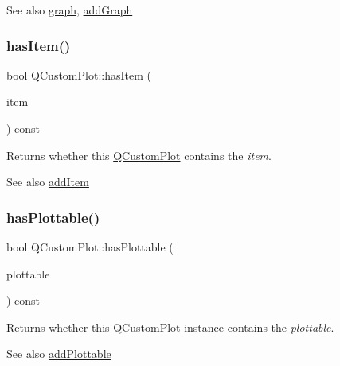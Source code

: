 \begin{DoxySeeAlso}{See also}
\hyperlink{class_q_custom_plot_a6ecae130f684b25276fb47bd3a5875c6}{graph}, \hyperlink{class_q_custom_plot_a6fb2873d35a8a8089842d81a70a54167}{add\+Graph} 
\end{DoxySeeAlso}
\hypertarget{class_q_custom_plot_af0b57f35646079f93fa6161a65b36109}{}\label{class_q_custom_plot_af0b57f35646079f93fa6161a65b36109} 
\subsubsection{\texorpdfstring{has\+Item()}{hasItem()}}
{\footnotesize\ttfamily bool Q\+Custom\+Plot\+::has\+Item (\begin{DoxyParamCaption}\item[{\hyperlink{class_q_c_p_abstract_item}{Q\+C\+P\+Abstract\+Item} $\ast$}]{item }\end{DoxyParamCaption}) const}

Returns whether this \hyperlink{class_q_custom_plot}{Q\+Custom\+Plot} contains the {\itshape item}.

\begin{DoxySeeAlso}{See also}
\hyperlink{class_q_custom_plot_aa500620379262321685cb7a7674cbd2a}{add\+Item} 
\end{DoxySeeAlso}
\hypertarget{class_q_custom_plot_a72cefbfbb9e699940e37be605bd9c51e}{}\label{class_q_custom_plot_a72cefbfbb9e699940e37be605bd9c51e} 
\subsubsection{\texorpdfstring{has\+Plottable()}{hasPlottable()}}
{\footnotesize\ttfamily bool Q\+Custom\+Plot\+::has\+Plottable (\begin{DoxyParamCaption}\item[{\hyperlink{class_q_c_p_abstract_plottable}{Q\+C\+P\+Abstract\+Plottable} $\ast$}]{plottable }\end{DoxyParamCaption}) const}

Returns whether this \hyperlink{class_q_custom_plot}{Q\+Custom\+Plot} instance contains the {\itshape plottable}.

\begin{DoxySeeAlso}{See also}
\hyperlink{class_q_custom_plot_ab7ad9174f701f9c6f64e378df77927a6}{add\+Plottable} 
\end{DoxySeeAlso}
\hypertarget{class_q_custom_plot_ac042f2e78edd228ccf2f26b7fe215239}{}\label{class_q_custom_plot_ac042f2e78edd228ccf2f26b7fe215239} 
